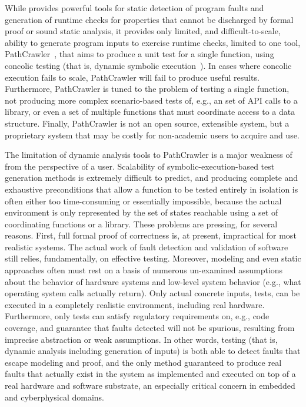 While \framac{} provides powerful tools for static detection of program faults and generation of runtime checks for properties that cannot be discharged by formal proof or sound static analysis, it provides only limited, and difficult-to-scale, ability to generate program inputs to exercise runtime checks, limited to one tool, PathCrawler~\cite{WilliamsMMR05EDCC}, that aims to produce a unit test for a single function, using concolic testing (that is, dynamic symbolic execution~\cite{GodefroidKS05}).  In cases where concolic execution fails to scale, PathCrawler will fail to produce useful results.  Furthermore, PathCrawler is tuned to the problem of testing a single function, not producing more complex scenario-based tests of, e.g., an set of API calls to a library, or even a set of multiple functions that must coordinate access to a data structure.  Finally, PathCrawler is not an open source, extensible system, but a proprietary system that may be costly for non-academic users to acquire and use.

The limitation of dynamic analysis tools to PathCrawler is a major weakness of \framac from the perspective of a user.  Scalability of symbolic-execution-based test generation methods is extremely difficult to predict, and producing complete and exhaustive preconditions that allow a function to be tested entirely in isolation is often either too time-consuming or essentially impossible, because the actual environment is only represented by the set of states reachable using a set of coordinating functions or a library.  These problems are pressing, for several reasons.  First, full formal proof of correctness is, at present, impractical for most realistic systems.  The actual work of fault detection and validation of software still relies, fundamentally, on effective testing.  Moreover, modeling and even static approaches often must rest on a basis of numerous un-examined assumptions about the behavior of hardware systems and low-level system behavior (e.g., what operating system calls actually return).  Only actual concrete inputs, tests, can be executed in a completely realistic environment, including real hardware.  Furthermore, only tests can satisfy regulatory requirements on, e.g., code coverage, and guarantee that faults detected will not be spurious, resulting from imprecise abstraction or weak assumptions.  In other words, testing (that is, dynamic analysis including generation of inputs) is both able to detect faults that escape modeling and proof, and the only method guaranteed to produce real faults that actually exist in the system as implemented and executed on top of a real hardware and software substrate, an especially critical concern in embedded and cyberphysical domains.

